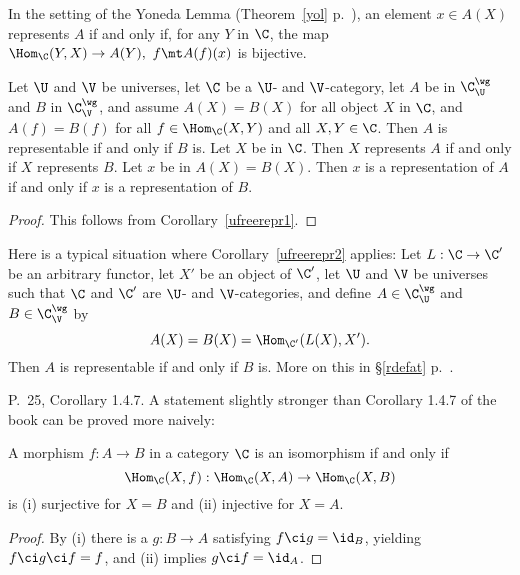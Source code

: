 \documentclass[12pt]{article}
\theoremstyle{remark}
\theoremstyle{definition}
\begin{document}
\begin{cor}
In the setting of the Yoneda Lemma (Theorem~\ref{yol} p.~), an element $x\in A(X)$ represents $A$ if and only if, for any $Y$ in $\C$, the map $\Hom_\C(Y,X)\to A(Y),\ f\mt A(f)(x)$ is bijective.
\end{cor}
\begin{cor}
Let $\U$ and $\V$ be universes, let $\C$ be a $\U$- and $\V$-category, let $A$ be in $\C^\wg_\U$ and $B$ in $\C^\wg_\V$, and assume $A(X)=B(X)$ for all object $X$ in $\C$, and $A(f)=B(f)$ for all $f\in\Hom_\C(X,Y)$ and all $X,Y\in\C$. Then $A$ is representable if and only if $B$ is. Let $X$ be in $\C$. Then $X$ represents $A$ if and only if $X$ represents $B$. Let $x$ be in $A(X)=B(X)$. Then $x$ is a representation of $A$ if and only if $x$ is a representation of $B$. %

\end{cor}
\begin{proof}
This follows from Corollary~\ref{ufreerepr1}.
\end{proof}

Here is a typical situation where Corollary~\ref{ufreerepr2} applies: Let $L:\C\to\C'$ be an arbitrary functor, let $X'$ be an object of $\C'$, let $\U$ and $\V$ be universes such that $\C$ and $\C'$ are $\U$- and $\V$-categories, and define $A\in\C^\wg_\U$ and $B\in\C^\wg_\V$ by 
$$
A(X)=B(X)=\Hom_{\C'}(L(X),X').
$$ 
Then $A$ is representable if and only if $B$ is. More on this in \S\ref{rdefat} p.~.



\begin{s}
P.~25, Corollary 1.4.7. A statement slightly stronger than Corollary 1.4.7 of the book can be proved more naively:

\begin{prop}
A morphism $f:A\to B$ in a category $\C$ is an isomorphism if and only if 
$$
\Hom_\C(X,f):\Hom_\C(X,A)\to\Hom_\C(X,B)
$$
is (i) surjective for $X=B$ and (ii) injective for $X=A$.
\end{prop}

\begin{proof} By (i) there is a $g:B\to A$ satisfying $f\ci g=\id_B$, yielding $f\ci g\ci f=f$, and (ii) implies $g\ci f=\id_A$.
\end{proof}
\end{s}
\end{document}
